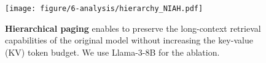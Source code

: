 \begin{figure}[t]
    \centering
    \texttt{[image: figure/6-analysis/hierarchy\_NIAH.pdf]}
    \caption{\textbf{Hierarchical paging} enables \system to preserve the long-context retrieval capabilities of the original model without increasing the key-value (KV) token budget. We use Llama-3-8B for the ablation.}

    
    \label{fig:ana:our_larger_page}
\end{figure}
